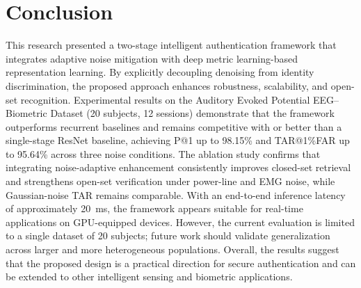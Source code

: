 \documentclass[a4paper,conference]{IEEEtran}
\begin{document}
	\section{Conclusion}
	This research presented a two-stage intelligent authentication framework that integrates adaptive noise mitigation with deep metric learning-based representation learning. By explicitly decoupling denoising from identity discrimination, the proposed approach enhances robustness, scalability, and open-set recognition. Experimental results on the Auditory Evoked Potential EEG--Biometric Dataset (20 subjects, 12 sessions) demonstrate that the framework outperforms recurrent baselines and remains competitive with or better than a single-stage ResNet baseline, achieving P@1 up to 98.15\% and TAR@1\%FAR up to 95.64\% across three noise conditions. The ablation study confirms that integrating noise-adaptive enhancement consistently improves closed-set retrieval and strengthens open-set verification under power-line and EMG noise, while Gaussian-noise TAR remains comparable. With an end-to-end inference latency of approximately 20~ms, the framework appears suitable for real-time applications on GPU-equipped devices. However, the current evaluation is limited to a single dataset of 20 subjects; future work should validate generalization across larger and more heterogeneous populations. Overall, the results suggest that the proposed design is a practical direction for secure authentication and can be extended to other intelligent sensing and biometric applications.
\end{document}
